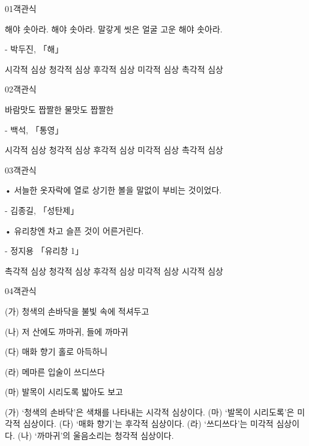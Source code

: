 \documentclass[fs9,seriesRus]{korfarm-base}
\begin{document}

\par\medskip
\kfBeginMC
\begin{kfQBlock}{01}{객관식}
\begin{kfEvidence}해야 솟아라. 해야 솟아라. 말갛게 씻은 얼굴 고운 해야 솟아라.

- 박두진, 「해」\end{kfEvidence}
\begin{kfChoices}
\kfChoice 시각적 심상
\kfChoice 청각적 심상
\kfChoice 후각적 심상
\kfChoice 미각적 심상
\kfChoice 촉각적 심상
\end{kfChoices}
\end{kfQBlock}
\begin{kfQBlock}{02}{객관식}
\begin{kfEvidence}바람맛도 짭짤한 물맛도 짭짤한

- 백석, 「통영」\end{kfEvidence}
\begin{kfChoices}
\kfChoice 시각적 심상
\kfChoice 청각적 심상
\kfChoice 후각적 심상
\kfChoice 미각적 심상
\kfChoice 촉각적 심상
\end{kfChoices}
\end{kfQBlock}
\begin{kfQBlock}{03}{객관식}
\begin{kfEvidence}• 서늘한 옷자락에 열로 상기한 볼을 말없이 부비는 것이었다.

 - 김종길, 「성탄제」

• 유리창엔 차고 슬픈 것이 어른거린다.

 - 정지용 「유리창 1」\end{kfEvidence}
\begin{kfChoices}
\kfChoice 촉각적 심상
\kfChoice 청각적 심상
\kfChoice 후각적 심상
\kfChoice 미각적 심상
\kfChoice 시각적 심상
\end{kfChoices}
\end{kfQBlock}
\begin{kfQBlock}{04}{객관식}
\begin{kfEvidence}(가) 청색의 손바닥을 불빛 속에 적셔두고

(나) 저 산에도 까마귀, 들에 까마귀

(다) 매화 향기 홀로 아득하니

(라) 메마른 입술이 쓰디쓰다

(마) 발목이 시리도록 밟아도 보고\end{kfEvidence}
\begin{kfChoices}
\kfChoice (가) ‘청색의 손바닥’은 색채를 나타내는 시각적 심상이다.
\kfChoice (마) ‘발목이 시리도록’은 미각적 심상이다.
\kfChoice (다) ‘매화 향기’는 후각적 심상이다.
\kfChoice (라) ‘쓰디쓰다’는 미각적 심상이다.
\kfChoice (나) ‘까마귀’의 울음소리는 청각적 심상이다.
\end{kfChoices}
\end{kfQBlock}
\end{document}
